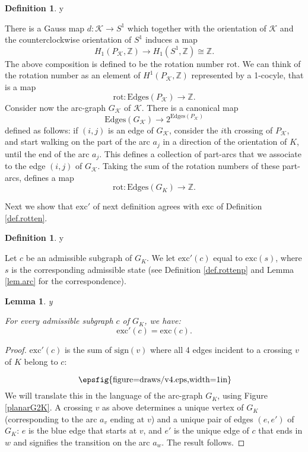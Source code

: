 \documentclass{amsart}
\theoremstyle{plain}
\newtheorem{lemma}[proposition]{Lemma}
\theoremstyle{definition}
\newtheorem{definition}[proposition]{Definition}
\theoremstyle{remark}
\def\printname#1{
        \if\draft y
                \smash{\makebox[0pt]{\hspace{-0.5in}
                        \raisebox{8pt}{\tt\tiny #1}}}
        \fi
}
\newcommand{\psdraw}[2]
         {\begin{array}{c} \hspace{-1.3mm}
        \raisebox{-4pt}{\epsfig{figure=draws/#1.eps,width=#2}}
        \hspace{-1.9mm}\end{array}}
\def\lbl#1{\label{#1}\printname{#1}}
\def\BZ{\mathbb Z}
\def\K{\mathcal K}
\def\rot{\mathrm{rot}}
\def\longto{\longrightarrow}
\def\sign{\mathrm{sign}}
\def\exc{\mathrm{exc}}
\def\longto{\longrightarrow}
\def\Edges{\mathrm{Edges}}
\begin{document}
\begin{definition}
\lbl{def.jjj}
There is a Gauss map $d: \K \to S^1$ which together with the orientation of $\K$ and 
the counterclockwise orientation of $S^1$ induces a map
$$
H_1(P_{\K},\BZ) \longto H_1(S^1,\BZ)\cong \BZ.
$$
The above composition is defined to be the rotation number $\rot$. We can
think of the rotation number as an element of $H^1(P_{\K},\BZ)$
represented by a 1-cocyle, that is a map
$$
\rot: \Edges(P_{\K}) \longto \BZ.
$$
Consider now the arc-graph $G_{\K}$ of $\K$. 
There is a canonical map
$$
\Edges(G_{\K}) \longto 2^{\Edges(P_{\K})}
$$
defined as follows: if $(i,j)$ is an edge of $G_{\K}$, consider the $i$th
crossing of $P_{\K}$, and start walking on the part of the arc $a_j$ in
a direction of the orientation of $K$, until the end of the arc $a_j$.
This defines a collection of part-arcs that we associate to the edge $(i,j)$
of $G_{\K}$. Taking the sum of the rotation numbers of these part-arcs, 
defines a map 
$$
\rot: \Edges(G_K)\longto \BZ.
$$
\end{definition}

Next we show that $\exc'$ of next definition agrees
with $\exc$ of Definition \ref{def.rotten}.


\begin{definition}
\lbl{def.rottenp1}
Let $c$ be an admissible subgraph of $G_K$. We let $\exc'(c)$ equal
to $\exc(s)$, where $s$ is the corresponding admissible state
(see Definition \ref{def.rottenp} and Lemma \ref{lem.arc} for the 
correspondence).
\end{definition}



\begin{lemma}
\lbl{lem.exc1}
For every admissible subgraph $c$ of $G_K$, we have:
$$
\exc'(c)=\exc(c).
$$
\end{lemma}


\begin{proof}
$\exc'(c)$ is the sum of $\sign(v)$ where all 4 edges incident to a crossing
$v$ of $K$ belong to $c$:
$$
\psdraw{v4}{1in}
$$ 
We will translate this in the language of the arc-graph $G_K$,
using Figure \ref{planarG2K}. A crossing $v$ as above determines a unique 
vertex of $G_K$ (corresponding to the arc $a_v$ ending at $v$) and a unique 
pair of edges $(e,e')$ of $G_K$: $e$ is the blue edge that starts at $v$,
and $e'$ is the unique edge of $c$ that ends in $w$ and signifies the
transition on the arc $a_w$. The result follows.
\end{proof}
\end{document}
